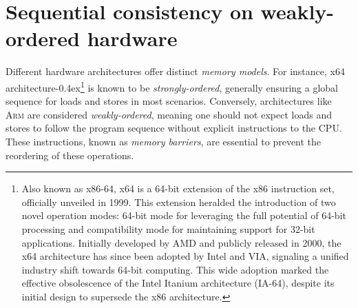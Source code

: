 \documentclass[fontsize=10pt, oneside]{scrartcl}
\newcommand{\punckern}{\kern-0.4ex}
\newcommand{\introduce}[1]{\textit{#1}}
\begin{document}
\section{Sequential consistency on weakly-ordered hardware}

Different hardware architectures offer distinct \introduce{memory models}.
For instance, x64 architecture\punckern\footnote{%
Also known as x86-64, x64 is a 64-bit extension of the x86 instruction set, officially unveiled in 1999.
This extension heralded the introduction of two novel operation modes:
64-bit mode for leveraging the full potential of 64-bit processing and compatibility mode for maintaining support for 32-bit applications.
Initially developed by AMD and publicly released in 2000, the x64 architecture has since been adopted by Intel and VIA,
signaling a unified industry shift towards 64-bit computing.
This wide adoption marked the effective obsolescence of the Intel Itanium architecture (IA-64),
despite its initial design to supersede the x86 architecture.
} is known to be \introduce{strongly-ordered},
generally ensuring a global sequence for loads and stores in most scenarios.
Conversely, architectures like \textsc{Arm} are considered \introduce{weakly-ordered},
meaning one should not expect loads and stores to follow the program sequence without explicit instructions to the \textsc{CPU}.
These instructions, known as \introduce{memory barriers}, are essential to prevent the reordering of these operations.
\end{document}
